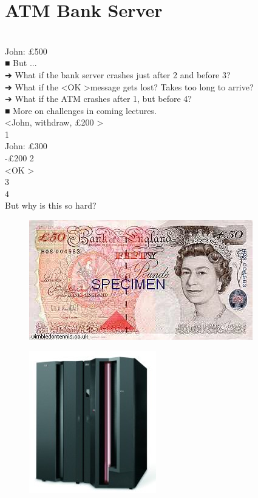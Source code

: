 \documentclass[12pt]{article}
\begin{document}
\section{ATM Bank Server}
\\
John: £500\\
■ But ...\\
➔ What if the bank server crashes just after 2 and before 3?\\
➔ What if the  \textless OK \textgreater  message gets lost? Takes too long to arrive?\\
➔ What if the ATM crashes after 1, but before 4?\\
■ More on challenges in coming lectures.\\
 \textless  John, withdraw, £200  \textgreater \\
1\\
John: £300\\
-£200 2\\
 \textless OK \textgreater \\
3\\
4\\
But why is this so hard?\\
\begin{figure}[H]
\includegraphics[width=0.5\linewidth]{page19-image-1.png}
\end{figure}
\begin{figure}[H]
\includegraphics[width=0.5\linewidth]{page19-image-2.png}
\end{figure}
\end{document}
